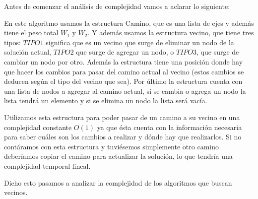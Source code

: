 Antes de comenzar el análisis de complejidad vamos a aclarar lo siguiente:

En este algoritmo usamos la estructura Camino, que es una lista de ejes y además tiene el peso total $W_1$ y $W_2$. Y además usamos la estructura vecino, que tiene tres tipos: $TIPO1$ significa que es un vecino que surge de eliminar un nodo de la solución actual, $TIPO2$ que surge de agregar un nodo, o $TIPO3$, que surge de cambiar un nodo por otro. Además la estructura tiene una posición donde hay que hacer los cambios para pasar del camino actual al vecino (estos cambios se deducen según el tipo del vecino que sea). Por último la estructura cuenta con una lista de nodos a agregar al camino actual, si se cambia o agrega un nodo la lista tendrá un elemento y si se elimina un nodo la lista será vacía.

Utilizamos esta estructura para poder pasar de un camino a su vecino en una complejidad constante $O(1)$ ya que ésta cuenta con la información necesaria para saber cuáles son los cambios a realizar y dónde hay que realizarlos. Si no contáramos con esta estructura y tuviésemos simplemente otro camino deberíamos copiar el camino para actualizar la solución, lo que tendría una complejidad temporal lineal.

Dicho esto pasamos a analizar la complejidad de los algoritmos que buscan vecinos.

